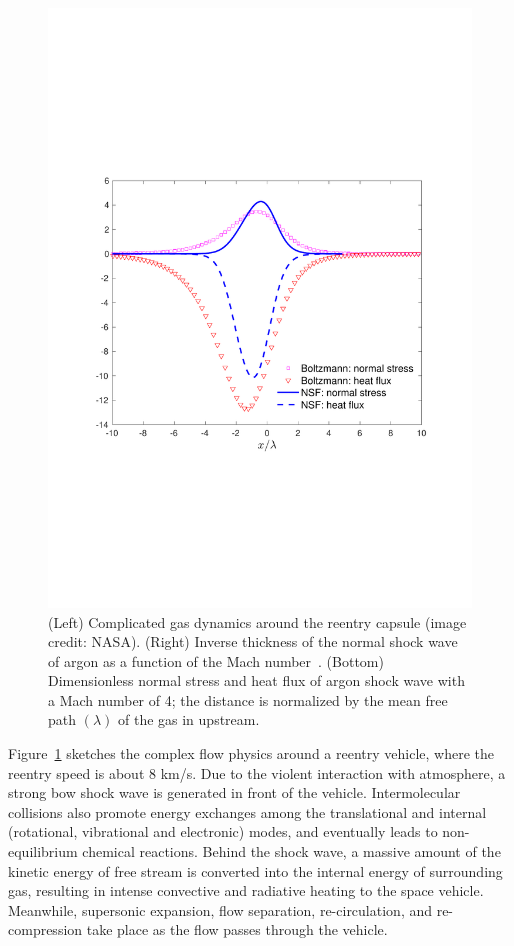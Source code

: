 \begin{figure}[t]
	\includegraphics[scale=0.4]{Introduction/IMG/Boltzmann_NS_shockMa4.pdf}
	\caption{
		(Left) Complicated gas dynamics around the reentry capsule (image credit: NASA). (Right) Inverse thickness of the normal shock wave of argon as a function of the Mach number~\cite{Alsmeyer1976JFM}. (Bottom) Dimensionless normal stress and heat flux of argon shock wave with a Mach number of 4; the distance is normalized by the mean free path $(\lambda)$ of the gas in upstream. 
	}
	\label{Re_entry}
\end{figure}


Figure~\ref{Re_entry} sketches the complex flow physics around a reentry vehicle, where the reentry speed is about 8 km/s. Due to the violent interaction with atmosphere, a strong bow shock wave is generated in front of the vehicle. Intermolecular collisions also promote energy exchanges among the translational and internal (rotational, vibrational and electronic) modes, and eventually leads to non-equilibrium chemical reactions. Behind the shock wave, a massive amount of the kinetic energy of free stream is converted into the internal energy of surrounding gas, resulting in intense convective and radiative heating to the space vehicle. Meanwhile, supersonic expansion, flow separation, re-circulation, and re-compression take place as the flow passes through the vehicle.


